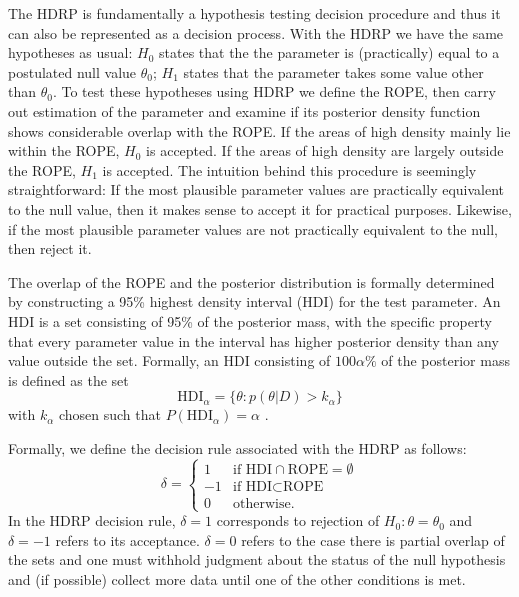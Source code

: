\documentclass[9pt,twocolumn,twoside]{cidlab-draft}\templatetype{cidlab-invited}
\newcommand{\hdr}{HDRP}
\newcommand{\HDI}{\text{HDI}}
\begin{document}
The \hdr{} is fundamentally a hypothesis testing decision procedure and thus it can also be represented as a decision process. With the \hdr{} we have the same hypotheses as usual: $H_0$ states that the the parameter is (practically) equal to a postulated null value $\theta_0$; $H_1$ states that the parameter takes some value other than $\theta_0$. To test these hypotheses using \hdr{} we define the ROPE, then carry out estimation of the parameter and examine if its posterior density function shows considerable overlap with the ROPE. If the areas of high density mainly lie within the ROPE, $H_0$ is accepted. If the areas of high density are largely outside the ROPE, $H_1$ is accepted. The intuition behind this procedure is seemingly straightforward: If the most plausible parameter values are practically equivalent to the null value, then it makes sense to accept it for practical purposes. Likewise, if the most plausible parameter values are not practically equivalent to the null, then reject it.

The overlap of the ROPE and the posterior distribution is formally determined by constructing a 95\% highest density interval (HDI) for the test parameter. An HDI is a set consisting of 95\% of the posterior mass, with the specific property that every parameter value in the interval has higher posterior density than any value outside the set. Formally, an HDI consisting of $100\alpha\%$ of the posterior mass is defined as the set  
\begin{equation}
    \HDI_\alpha = \{\theta:p(\theta|D)>k_\alpha\}\label{eq:hdi}
\end{equation}
with $k_\alpha$ chosen such that $P\left(\HDI_\alpha\right)=\alpha$ \cite{druilhet2007}. 

Formally, we define the decision rule associated with the \hdr{} as follows:
\begin{equation*}
    \delta =
    \begin{cases}
    1 & \text{if HDI} \cap \text{ROPE} = \emptyset \\ %
    -1 & \text{if HDI} \subset \text{ROPE}\\
    0 & \text{otherwise}.
    \end{cases}
\end{equation*}
In the \hdr{} decision rule, $\delta=1$ corresponds to rejection of $H_0:\theta=\theta_0$ and $\delta=-1$ refers to its acceptance. $\delta=0$ refers to the case there is partial overlap of the sets and one must withhold judgment about the status of the null hypothesis and (if possible) collect more data until one of the other conditions is met.
\end{document}
